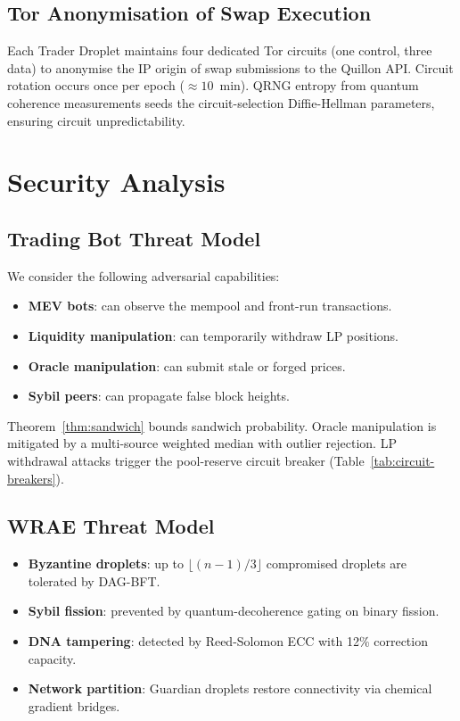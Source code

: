 \documentclass[12pt,a4paper]{article}
\begin{document}
\subsection{Tor Anonymisation of Swap Execution}

Each Trader Droplet maintains four dedicated Tor circuits
(one control, three data) to anonymise the IP origin of swap submissions to
the Quillon API.  Circuit rotation occurs once per epoch ($\approx 10$~min).
QRNG entropy from quantum coherence measurements seeds the circuit-selection
Diffie-Hellman parameters, ensuring circuit unpredictability.

\section{Security Analysis}
\label{sec:security}

\subsection{Trading Bot Threat Model}

We consider the following adversarial capabilities:
\begin{itemize}
\item \textbf{MEV bots}: can observe the mempool and front-run transactions.
\item \textbf{Liquidity manipulation}: can temporarily withdraw LP positions.
\item \textbf{Oracle manipulation}: can submit stale or forged prices.
\item \textbf{Sybil peers}: can propagate false block heights.
\end{itemize}

Theorem~\ref{thm:sandwich} bounds sandwich probability.  Oracle manipulation is
mitigated by a multi-source weighted median with outlier rejection.
LP withdrawal attacks trigger the pool-reserve circuit breaker
(Table~\ref{tab:circuit-breakers}).

\subsection{WRAE Threat Model}

\begin{itemize}
\item \textbf{Byzantine droplets}: up to $\lfloor(n-1)/3\rfloor$ compromised
      droplets are tolerated by DAG-BFT.
\item \textbf{Sybil fission}: prevented by quantum-decoherence gating on
      binary fission.
\item \textbf{DNA tampering}: detected by Reed-Solomon ECC with 12\%
      correction capacity.
\item \textbf{Network partition}: Guardian droplets restore connectivity via
      chemical gradient bridges.
\end{itemize}
\end{document}
